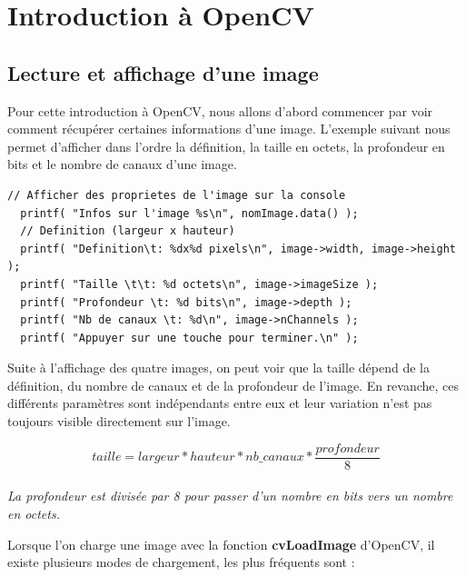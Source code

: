 \section{Introduction à OpenCV}

\subsection{Lecture et affichage d'une image}

Pour cette introduction à OpenCV, nous allons d'abord commencer par voir comment récupérer
certaines informations d'une image. L'exemple suivant nous permet d'afficher dans l'ordre 
la définition, la taille en octets, la profondeur en bits et le nombre de canaux d'une image.\\

\begin{lstlisting}[caption=Afficher les champs de la structure IplImage]
  // Afficher des proprietes de l'image sur la console
  printf( "Infos sur l'image %s\n", nomImage.data() );
  // Definition (largeur x hauteur)
  printf( "Definition\t: %dx%d pixels\n", image->width, image->height );
  printf( "Taille \t\t: %d octets\n", image->imageSize );
  printf( "Profondeur \t: %d bits\n", image->depth );
  printf( "Nb de canaux \t: %d\n", image->nChannels );
  printf( "Appuyer sur une touche pour terminer.\n" );
\end{lstlisting}




Suite à l'affichage des quatre images, on peut voir que la taille dépend de la définition, du nombre 
de canaux et de la profondeur de l'image. En revanche, ces différents paramètres sont indépendants entre 
eux et leur variation n'est pas toujours visible directement sur l'image.\\

\begin{framed}
$$ 
 taille = largeur * hauteur * nb\_canaux * \frac{profondeur}{8}
$$
\\
{\footnotesize \textit{La profondeur est divisée par 8 pour passer d'un nombre en bits vers un nombre en octets.}}
\end{framed}

Lorsque l'on charge une image avec la fonction \textbf{cvLoadImage} d'OpenCV, il existe plusieurs 
modes de chargement, les plus fréquents sont : \\

